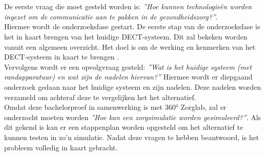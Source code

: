 \section{}%
\label{sec:prep}%
De eerste vraag die moet gesteld worden is: \textit{''Hoe kunnen technologieën worden ingezet om de communicatie aan te pakken in de gezondheidszorg?''}.\\ 

Hiermee wordt de onderzoeksfase gestart. De eerste stap van de onderzoeksfase is het in kaart brengen van het huidige DECT-systeem. Dit zal bekeken worden vanuit een algemeen overzicht. Het doel is om de werking en kenmerken van het DECT-systeem in kaart te brengen .\\
Vervolgens wordt er een opvolgvraag gesteld: \textit{''Wat is het huidige systeem (met randapparatuur) en wat zijn de nadelen hiervan?''} Hiermee wordt er diepgaand onderzoek gedaan naar het huidige systeem en zijn nadelen. Deze nadelen worden verzameld om achteraf deze te vergelijken het het alternatief.\\ Omdat deze bachelorproef in samenwerking is met 360° Zorglab, zal er onderzocht moeten worden \textit{''Hoe kan een zorgsimulatie worden gesimuleerd?''}. Als dit gekend is kan er een stappenplan worden opgesteld om het alternatief te kunnen testen in zo'n simulatie.
Nadat deze vragen te hebben beantwoord, is het probleem volledig in kaart gebracht.\\



